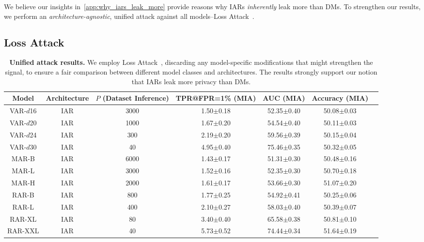 {We believe our insights in~\cref{app:why_iars_leak_more} provide reasons why IARs \textit{inherently} leak more than DMs. To strengthen our results, we perform an \textit{architecture-agnostic}, unified attack against all models--Loss Attack~\citep{yeom2018lossmia}}.

\subsection{Loss Attack}

\begin{table}[]
    \centering
    \scriptsize
    \caption{{\textbf{Unified attack results.} We employ Loss Attack~\citep{yeom2018lossmia}, discarding any model-specific modifications that might strengthen the signal, to ensure a fair comparison between different model classes and architectures. The results strongly support our notion that IARs leak more privacy than DMs.}}
\begin{tabular}{ccccccc}
\toprule
Model & Architecture & $P$ (Dataset Inference) & TPR@FPR=1\% (MIA) & AUC (MIA) & Accuracy (MIA) \\
\midrule
VAR-$\mathit{d}$16 & IAR & 3000 & 1.50{\tiny $\pm$0.18} & 52.35{\tiny $\pm$0.40} & 50.08{\tiny $\pm$0.03} \\
VAR-$\mathit{d}$20 & IAR & 1000 & 1.67{\tiny $\pm$0.20} & 54.54{\tiny $\pm$0.40} & 50.11{\tiny $\pm$0.03} \\
VAR-$\mathit{d}$24 & IAR & 300 & 2.19{\tiny $\pm$0.20} & 59.56{\tiny $\pm$0.39} & 50.15{\tiny $\pm$0.04} \\
VAR-$\mathit{d}$30 & IAR & 40 & 4.95{\tiny $\pm$0.40} & 75.46{\tiny $\pm$0.35} & 50.32{\tiny $\pm$0.05} \\
MAR-B & IAR & 6000 & 1.43{\tiny $\pm$0.17} & 51.31{\tiny $\pm$0.30} & 50.48{\tiny $\pm$0.16} \\
MAR-L & IAR & 3000 & 1.52{\tiny $\pm$0.16} & 52.35{\tiny $\pm$0.30} & 50.70{\tiny $\pm$0.18} \\
MAR-H & IAR & 2000 & 1.61{\tiny $\pm$0.17} & 53.66{\tiny $\pm$0.30} & 51.07{\tiny $\pm$0.20} \\
RAR-B & IAR & 800 & 1.77{\tiny $\pm$0.25} & 54.92{\tiny $\pm$0.41} & 50.25{\tiny $\pm$0.06} \\
RAR-L & IAR & 400 & 2.10{\tiny $\pm$0.27} & 58.03{\tiny $\pm$0.40} & 50.39{\tiny $\pm$0.07} \\
RAR-XL & IAR & 80 & 3.40{\tiny $\pm$0.40} & 65.58{\tiny $\pm$0.38} & 50.81{\tiny $\pm$0.10} \\
RAR-XXL & IAR & 40 & 5.73{\tiny $\pm$0.52} & 74.44{\tiny $\pm$0.34} & 51.64{\tiny $\pm$0.19} \\

\end{tabular}
\end{table}
